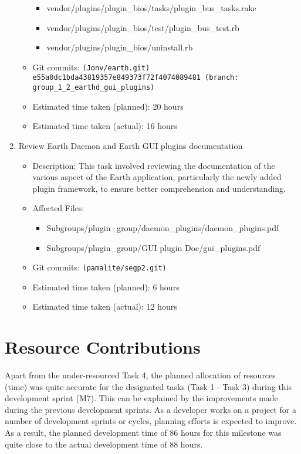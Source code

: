 \begin{enumerate}
\begin{itemize}
\begin{itemize}
                    \item vendor/plugins/plugin\_bios/tasks/plugin\_bus\_tasks.rake
                    \item vendor/plugins/plugin\_bios/test/plugin\_bus\_test.rb
                    \item vendor/plugins/plugin\_bios/uninstall.rb
                \end{itemize}
            \item Git commits: \texttt{(Jonv/earth.git) e55a0dc1bda43819357e849373f72f4074089481 (branch: group\_1\_2\_earthd\_gui\_plugins)}
            \item Estimated time taken (planned): 20 hours
            \item Estimated time taken (actual): 16 hours
        \end{itemize}
    \item Review Earth Daemon and Earth GUI plugins documentation
        \begin{itemize}
            \item Description: This task involved reviewing the documentation of the various aspect of the Earth application, particularly the newly added plugin framework, to ensure better comprehension and understanding.
            \item Affected Files:
                \begin{itemize}
                    \item Subgroups/plugin\_group/daemon\_plugins/daemon\_plugins.pdf
                    \item Subgroups/plugin\_group/GUI plugin Doc/gui\_plugins.pdf
                \end{itemize}
            \item Git commits: \texttt{(pamalite/segp2.git)}
            \item Estimated time taken (planned): 6 hours
            \item Estimated time taken (actual): 12 hours
        \end{itemize}
\end{enumerate}

\section*{Resource Contributions}

Apart from the under-resourced Task 4, the planned allocation of resources (time) was quite accurate for the designated tasks (Task 1 - Task 3) during this development sprint (M7). This can be explained by the improvements made during the previous development sprints. As a developer works on a project for a number of development sprints or cycles, planning efforts is expected to improve. As a result, the planned development time of 86 hours for this milestone was quite close to the actual development time of 88 hours. \\

